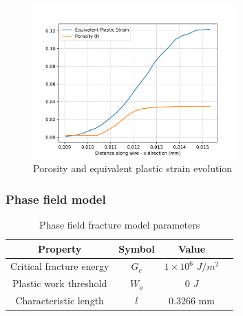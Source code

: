 \documentclass[sn-mathphys,Numbered,draft]{sn-jnl}%
\begin{document}
\begin{figure}[htb]
\begin{center}
	\includegraphics[width=0.7\textwidth]{./Figures/SimulationAndAnalysis/modelCompare/GTNElement.png}
\caption{Porosity and equivalent plastic strain evolution}
\label{fig:notchedRoundBAr}
\end{center}
\end{figure}

\FloatBarrier

\subsubsection{Phase field model}

\begin{table}[htb]
	\centering
		\begin{tabular}{cccc} \hline
			Property & Symbol & Value  \\ \hline 
			Critical fracture energy & $G_c$ & $1\times10^6$ $J/m^2$ \\
   		Plastic work threshold & $W_o$ & $0$ $J$ \\
			Characteristic length & $l$ & $0.3266$ mm   \\
			\hline
		\end{tabular}
	\caption{Phase field fracture model parameters}
	\label{tab:material_properties}
\end{table}
\end{document}
